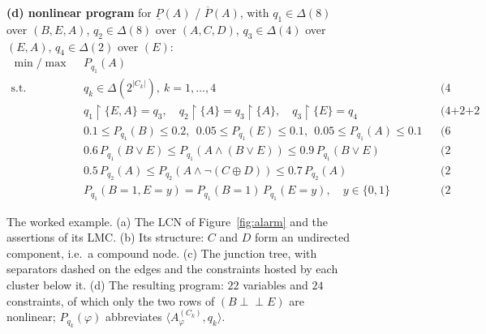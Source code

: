 \documentclass{article} %
\newcommand{\lo}{\underline}
\newcommand{\hi}{\overline}
\newcommand{\indep}{\perp\!\!\!\perp}
\newcommand{\restr}{\!\restriction\!}
\begin{document}
\begin{figure}[t]

\vspace{4pt}
\small
\begin{minipage}{0.98\linewidth}
\textbf{(d) nonlinear program} for $\lo P(A)$ / $\hi P(A)$, with
$q_1\in\Delta(8)$ over $(B,E,A)$, $q_2\in\Delta(8)$ over $(A,C,D)$,
$q_3\in\Delta(4)$ over $(E,A)$, $q_4\in\Delta(2)$ over $(E)$:
\[
\begin{aligned}
\min/\max\ \ & P_{q_1}(A)\\
\text{s.t.}\ \ & q_k\in\Delta(2^{|C_k|}),\ k=1,\dots,4
  && \text{(4 simplex)}\\
& q_1\restr\{E,A\}=q_3,\quad q_2\restr\{A\}=q_3\restr\{A\},\quad
  q_3\restr\{E\}=q_4
  && \text{(4+2+2 separator)}\\
& 0.1\le P_{q_1}(B)\le0.2,\ \ 0.05\le P_{q_1}(E)\le0.1,\ \
  0.05\le P_{q_1}(A)\le0.1
  && \text{(6 sentence, linear)}\\
& 0.6\,P_{q_1}(B\vee E)\le P_{q_1}(A\wedge(B\vee E))\le0.9\,P_{q_1}(B\vee E)
  && \text{(2 sentence, linear)}\\
& 0.5\,P_{q_2}(A)\le P_{q_2}(A\wedge\lnot(C\oplus D))\le0.7\,P_{q_2}(A)
  && \text{(2 sentence, linear)}\\
& P_{q_1}(B{=}1,E{=}y)=P_{q_1}(B{=}1)\,P_{q_1}(E{=}y),\quad y\in\{0,1\}
  && \text{(2 assertion, bilinear)}
\end{aligned}
\]
\end{minipage}
\caption{The worked example. (a) The LCN of Figure~\ref{fig:alarm} and the
assertions of its LMC. (b) Its structure: $C$ and $D$ form an undirected
component, i.e.\ a compound node. (c) The junction tree, with separators dashed
on the edges and the constraints hosted by each cluster below it. (d) The
resulting program: $22$ variables and $24$ constraints, of which only the two
rows of $(B\indep E)$ are nonlinear; $P_{q_k}(\varphi)$ abbreviates
$\langle A^{(C_k)}_\varphi,q_k\rangle$.}
\label{fig:cjt-example}
\end{figure}
\end{document}
